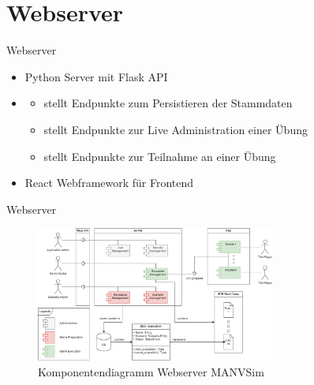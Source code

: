 
\section{Webserver}

\begin{frame}{Webserver}
	\begin{itemize}
		\item Python Server mit Flask API
		\item \begin{itemize}
			\item stellt Endpunkte zum Persistieren der Stammdaten
			\item stellt Endpunkte zur Live Administration einer Übung
			\item stellt Endpunkte zur Teilnahme an einer Übung
		\end{itemize}
		\item React Webframework für Frontend
	\end{itemize}
\end{frame}

\begin{frame}{Webserver}
	\begin{figure}
		\begin{center}
			\includegraphics[width=0.7\textwidth]{images/server/component_diagram.png}
		\end{center}
		\caption{Komponentendiagramm Webserver MANVSim}\label{fig:autounfall}
	\end{figure}
\end{frame}
